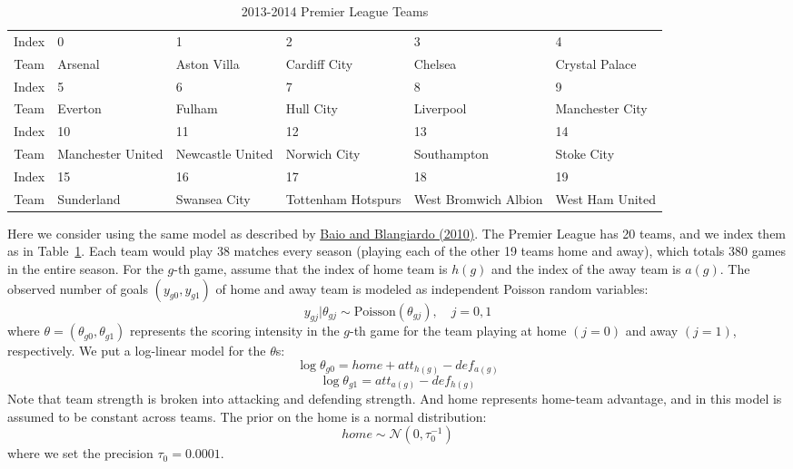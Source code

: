 \documentclass[12pt,letterpaper, onecolumn]{exam}
\begin{document}
\begin{questions}
{\fontsize{8}{10}\selectfont
\begin{table*}[h!] %
\caption{2013-2014 Premier League Teams}
\vspace{2mm}
\setlength\tabcolsep{0.7pt}
\begin{tabular}{|c || *{1}{K{3cm}} | *{1}{K{3cm}} | *{1}{K{3cm}} | *{1}{K{3cm}} | *{1}{K{3cm}} |}
\hline
Index & 0 & 1 & 2 & 3 & 4 \\
Team & Arsenal & Aston Villa & Cardiff City & Chelsea & Crystal Palace \\
\hline
\hline
Index & 5 & 6 & 7 & 8 & 9 \\
Team & Everton & Fulham & Hull City & Liverpool & Manchester City \\
\hline
\hline
Index & 10 & 11 & 12 & 13 & 14 \\
Team & Manchester United & Newcastle United & Norwich City & Southampton & Stoke City \\
\hline
\hline
Index & 15 & 16 & 17 & 18 & 19 \\
Team & Sunderland & Swansea City & Tottenham Hotspurs & West Bromwich Albion & West Ham United \\
\hline
\end{tabular}
\label{teams}
\end{table*}
}

Here we consider using the same model as described by \href{https://www.tandfonline.com/doi/full/10.1080/02664760802684177}{Baio and Blangiardo (2010)}. The Premier League has 20 teams, and we index them as in Table~\ref{teams}. Each team would play 38 matches every season (playing each of the other 19 teams home and away), which totals 380 games in the entire season. For the $g$-th game, assume that the index of home team is $h(g)$ and the index of the away team is $a(g)$.
The observed number of goals $ (y_{g0}, y_{g1}) $ of home and away team is modeled as independent Poisson random variables:
\begin{equation}
y_{gj} | \theta_{gj} \sim \textrm{Poisson}(\theta_{gj}), \quad j = 0,1
\end{equation}
where $\theta = (\theta_{g0},\theta_{g1})$ represents the scoring intensity in the $g$-th game for the team playing at home $(j = 0)$ and away $(j = 1)$, respectively. We put a log-linear model for the $\theta$s:
\begin{equation}
\log \theta_{g0} = home + att_{h(g)} - def_{a(g)}
\end{equation}
\begin{equation}
\log \theta_{g1} = att_{a(g)} - def_{h(g)}
\end{equation}
Note that team strength is broken into attacking and defending strength. And home represents home-team advantage, and in this model is assumed to be constant across teams. The prior on the home is a normal distribution:
\begin{equation}
home \sim \mathcal{N} (0, \tau_0^{-1})
\end{equation}
where we set the precision $\tau_0 = 0.0001$.


\end{questions}
\end{document}
